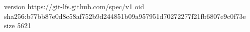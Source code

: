 version https://git-lfs.github.com/spec/v1
oid sha256:b77bb87e0d8c58af752b9d244851b09a957951d70272277f21fb6807e9c0f73e
size 5621
